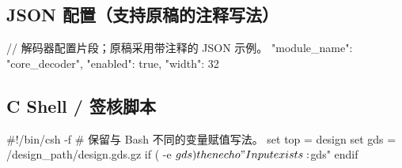 \documentclass[10pt,letterpaper]{book}
\begin{document}
\subsection*{JSON 配置（支持原稿的注释写法）}
\begin{CodeBlock}[language=BookJSON]
{
  // 解码器配置片段；原稿采用带注释的 JSON 示例。
  "module_name": "core_decoder",
  "enabled": true,
  "width": 32
}
\end{CodeBlock}

\subsection*{C Shell / 签核脚本}
\begin{CodeBlock}[language=BookCShell]
#!/bin/csh -f
# 保留与 Bash 不同的变量赋值写法。
set top = design
set gds = /design_path/design.gds.gz
if ( -e $gds ) then
  echo "Input exists: $gds"
endif
\end{CodeBlock}
\end{document}
